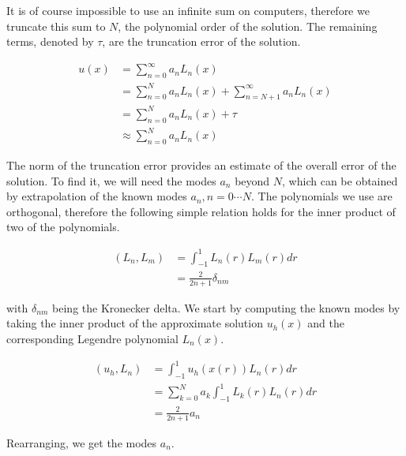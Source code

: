 It is of course impossible to use an infinite sum on computers, therefore we truncate this sum to
\(N\), the polynomial order of the solution. The remaining terms, denoted by \(\tau \), are the
truncation error of the solution.

\begin{equation} \label{equ:solution_approximation}
	\begin{aligned}
		u(x) &= \sum_{n = 0}^{\infty } a_n L_n(x) \\
		&= \sum_{n = 0}^{N}a_n L_n(x) + \sum_{n = N + 1}^{\infty }a_n L_n(x) \\ 
		&= \sum_{n = 0}^{N}a_n L_n(x) + \tau \\
		&\approx \sum_{n = 0}^{N}a_n L_n(x)
	\end{aligned}
\end{equation}

The norm of the truncation error provides an estimate of the overall error of the solution. To find
it, we will need the modes \(a_n\) beyond \(N\), which can be obtained by extrapolation of the known
modes \(a_n, n = 0 \cdots N\). The polynomials we use are orthogonal, therefore the following simple
relation holds for the inner product of two of the polynomials.

\begin{equation} \label{equ:polynomial_orthogonality}
	\begin{aligned}
		\left( L_n, L_m \right) &= \int_{-1}^{1}L_n(r)L_m(r)dr \\
		&= \frac{2}{2n + 1}\delta _{n m}
	\end{aligned}
\end{equation}

\noindent
with \(\delta_{n m}\) being the Kronecker delta. We start by computing the known modes by taking the
inner product of the approximate solution \(u_h(x)\) and  the corresponding Legendre polynomial
\(L_n(x)\).

\begin{equation} \label{equ:modes_inner_product}
	\begin{aligned}
		\left( u_h, L_n \right) &= \int_{-1}^{1} u_h(x(r)) L_n(r) dr \\
		&= \sum_{k = 0}^{N} a_k \int_{-1}^{1} L_k(r) L_n(r)dr \\
		&= \frac{2}{2n + 1} a_n
	\end{aligned}
\end{equation}

\noindent
Rearranging, we get the modes \(a_n\).

